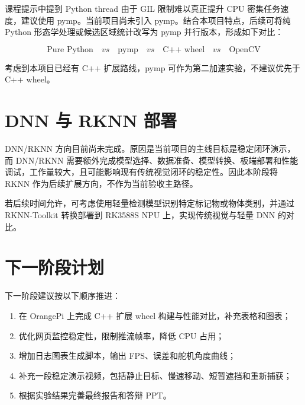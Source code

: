 课程提示中提到 Python thread 由于 GIL 限制难以真正提升 CPU 密集任务速度，建议使用 pymp。当前项目尚未引入 pymp。结合本项目特点，后续可将纯 Python 形态学处理或候选区域统计改写为 pymp 并行版本，形成如下对比：

\begin{equation}
  \text{Pure Python} \quad vs \quad \text{pymp} \quad vs \quad \text{C++ wheel} \quad vs \quad \text{OpenCV}
\end{equation}

考虑到本项目已经有 C++ 扩展路线，pymp 可作为第二加速实验，不建议优先于 C++ wheel。

\section{DNN 与 RKNN 部署}

DNN/RKNN 方向目前尚未完成。原因是当前项目的主线目标是稳定闭环演示，而 DNN/RKNN 需要额外完成模型选择、数据准备、模型转换、板端部署和性能调试，工作量较大，且可能影响现有传统视觉闭环的稳定性。因此本阶段将 RKNN 作为后续扩展方向，不作为当前验收主路径。

若后续时间允许，可考虑使用轻量检测模型识别特定标记物或物体类别，并通过 RKNN-Toolkit 转换部署到 RK3588S NPU 上，实现传统视觉与轻量 DNN 的对比。

\section{下一阶段计划}

下一阶段建议按以下顺序推进：

\begin{enumerate}
  \item 在 OrangePi 上完成 C++ 扩展 wheel 构建与性能对比，补充表格和图表；
  \item 优化网页监控稳定性，限制推流帧率，降低 CPU 占用；
  \item 增加日志图表生成脚本，输出 FPS、误差和舵机角度曲线；
  \item 补充一段稳定演示视频，包括静止目标、慢速移动、短暂遮挡和重新捕获；
  \item 根据实验结果完善最终报告和答辩 PPT。
\end{enumerate}

